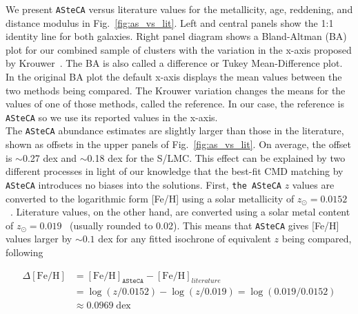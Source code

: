 \documentclass{aa}
\begin{document}
We present \texttt{ASteCA} versus literature values for the metallicity, age,
reddening, and distance modulus in Fig.~\ref{fig:as_vs_lit}. Left and
central panels show the 1:1 identity line for both galaxies.
%
Right panel diagram shows a Bland-Altman (BA) plot for our combined sample
of clusters with the variation in the x-axis proposed by
Krouwer~\citep{Bland_1986,Krouwer_2008}. The BA is also called a
difference or Tukey Mean-Difference plot. In the original BA plot the
default x-axis displays the mean values between the two methods being compared.
The Krouwer variation changes the means for the values of one of those methods,
called the reference. In our case, the reference is \texttt{ASteCA}
so we use its reported values in the x-axis.\\
%

The \texttt{ASteCA} abundance estimates are slightly larger than those in
the literature, shown as offsets in the upper panels of Fig.~\ref{fig:as_vs_lit}.
On average, the offset is $\sim$0.27 dex and $\sim$0.18 dex for the S/LMC.\@
%
This effect can be explained by two different processes in light of our
knowledge that the best-fit CMD matching by  \texttt{ASteCA} introduces no
biases into the solutions.
%
First, \texttt{the ASteCA} $z$ values are converted to the logarithmic
form [Fe/H] using a solar metallicity of
$z_{\odot}{=}0.0152$~\citep{Bressan_2012}.
Literature values, on the other hand, are converted using a solar
metal content of $z_{\odot}{=}0.019$~\citep{Marigo_2008} (usually
rounded to 0.02). This means that \texttt{ASteCA} gives [Fe/H] values
larger by ${\sim}0.1$ dex for any fitted isochrone of equivalent $z$ being
compared, following

\begin{equation}
\begin{split}
\Delta\mathrm{[Fe/H]} & = \mathrm{[Fe/H]}_{\mathtt{ASteCA}} -
\mathrm{[Fe/H]}_{literature} \\
& = \log(z/0.0152) - \log(z/0.019) = \log(0.019/0.0152) \\
& \approx 0.0969 \;\mathrm{dex}
\end{split}
\label{eq:delta_feh}
\end{equation}
\end{document}
